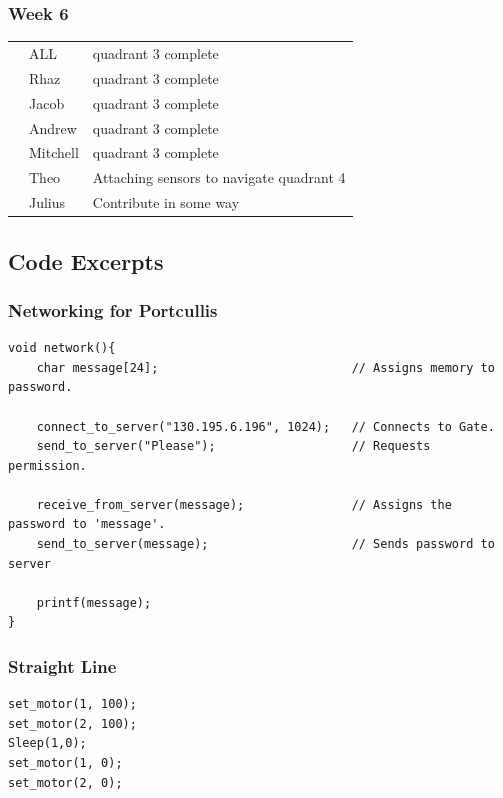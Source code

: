 \documentclass[paper=a4, fontsize=11pt]{scrartcl} %
\def\checkmark{\tikz\fill[scale=0.4] (0,.35) -- (.25,0) -- (1,.7) -- (.25,.15) -- cycle;}
\def\scalecheck{\resizebox{\widthof{\checkmark}*\ratio{\widthof{x}}{\widthof{\normalsize x}}}{!}{\checkmark}}
\numberwithin{equation}{section} %
\numberwithin{figure}{section} %
\begin{document}
\subsubsection*{Week 6}
\begin{tabularx}{\textwidth}{clX}
              & ALL      & quadrant 3 complete\\
              & Rhaz     & quadrant 3 complete\\
              & Jacob    & quadrant 3 complete\\ 
              & Andrew   & quadrant 3 complete\\ 
              & Mitchell & quadrant 3 complete\\ 
  \scalecheck & Theo     & Attaching sensors to navigate quadrant 4\\
              & Julius   & Contribute in some way\\
\end{tabularx}

\subsection{Code Excerpts}

\subsubsection{Networking for Portcullis}
\begin{verbatim}
void network(){
	char message[24];							// Assigns memory to password.

	connect_to_server("130.195.6.196", 1024);	// Connects to Gate.
	send_to_server("Please");					// Requests permission.

	receive_from_server(message);				// Assigns the password to 'message'.
	send_to_server(message);					// Sends password to server

	printf(message);
}
\end{verbatim}

\subsubsection{Straight Line}
\begin{verbatim}
set_motor(1, 100);
set_motor(2, 100);
Sleep(1,0);
set_motor(1, 0);
set_motor(2, 0);

\end{verbatim}
\end{document}
